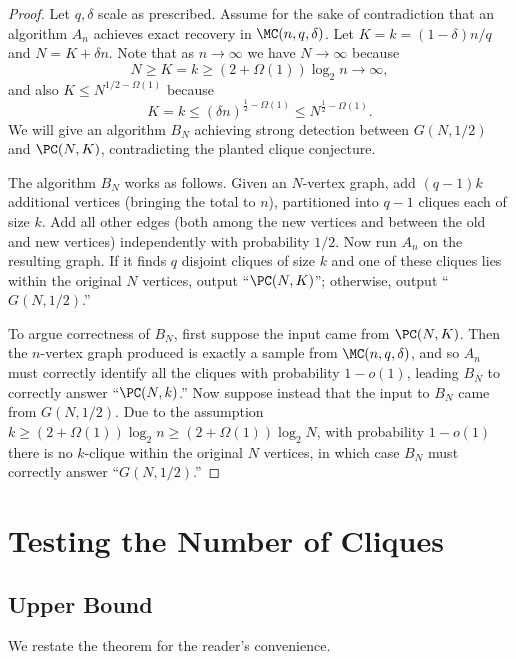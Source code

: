 \documentclass{article}
\begin{document}
\begin{proof}
Let $q,\delta$ scale as prescribed. Assume for the sake of contradiction that an algorithm $A_n$ achieves exact recovery in $\MC(n,q,\delta)$. Let $K = k = (1-\delta)n/q$ and $N = K + \delta n$. Note that as $n \to \infty$ we have $N \to \infty$ because
\[ N \ge K = k \ge (2+\Omega(1)) \log_2 n \to \infty, \]
and also $K \le N^{1/2 - \Omega(1)}$ because
\[ K = k \le (\delta n)^{\frac{1}{2}-\Omega(1)} \le N^{\frac{1}{2}-\Omega(1)}. \]
We will give an algorithm $B_N$ achieving strong detection between $G(N,1/2)$ and $\PC(N,K)$, contradicting the planted clique conjecture.

The algorithm $B_N$ works as follows. Given an $N$-vertex graph, add $(q-1)k$ additional vertices (bringing the total to $n$), partitioned into $q-1$ cliques each of size $k$. Add all other edges (both among the new vertices and between the old and new vertices) independently with probability $1/2$. Now run $A_n$ on the resulting graph. If it finds $q$ disjoint cliques of size $k$ and one of these cliques lies within the original $N$ vertices, output ``$\PC(N,K)$''; otherwise, output ``$G(N,1/2)$.''

To argue correctness of $B_N$, first suppose the input came from $\PC(N,K)$. Then the $n$-vertex graph produced is exactly a sample from $\MC(n,q,\delta)$, and so $A_n$ must correctly identify all the cliques with probability $1-o(1)$, leading $B_N$ to correctly answer ``$\PC(N,k)$.'' Now suppose instead that the input to $B_N$ came from $G(N,1/2)$. Due to the assumption $k \ge (2+\Omega(1)) \log_2 n \ge (2+\Omega(1)) \log_2 N$, with probability $1-o(1)$ there is no $k$-clique within the original $N$ vertices, in which case $B_N$ must correctly answer ``$G(N,1/2)$.''
\end{proof}


\section{Testing the Number of Cliques}

\subsection{Upper Bound}

We restate the theorem for the reader's convenience.

\thmtestingupper*
\end{document}
